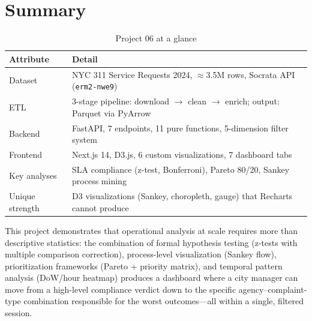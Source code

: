 \section{Summary}
\label{sec:ops-summary}

\begin{table}[h]
\centering
\caption{Project 06 at a glance}
\label{tab:ops-summary}
\begin{tabularx}{\textwidth}{lX}
\toprule
\textbf{Attribute} & \textbf{Detail} \\
\midrule
Dataset & NYC 311 Service Requests 2024, $\approx$3.5M rows, Socrata API (\texttt{erm2-nwe9}) \\
ETL & 3-stage pipeline: download $\to$ clean $\to$ enrich; output: Parquet via PyArrow \\
Backend & FastAPI, 7 endpoints, 11 pure functions, 5-dimension filter system \\
Frontend & Next.js 14, D3.js, 6 custom visualizations, 7 dashboard tabs \\
Key analyses & SLA compliance (z-test, Bonferroni), Pareto 80/20, Sankey process mining \\
Unique strength & D3 visualizations (Sankey, choropleth, gauge) that Recharts cannot produce \\
\bottomrule
\end{tabularx}
\end{table}

This project demonstrates that operational analysis at scale requires more than descriptive statistics: the combination of formal hypothesis testing (z-tests with multiple comparison correction), process-level visualization (Sankey flow), prioritization frameworks (Pareto + priority matrix), and temporal pattern analysis (DoW/hour heatmap) produces a dashboard where a city manager can move from a high-level compliance verdict down to the specific agency--complaint-type combination responsible for the worst outcomes---all within a single, filtered session.
